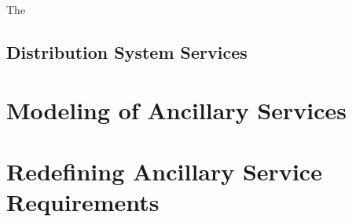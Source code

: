 The 
\subsection{Distribution System Services} %
\label{sub:dsoservices}

\section{Modeling of Ancillary Services} %
\label{sec:Modeling of Ancillary Services}


\section{Redefining Ancillary Service Requirements} %
\label{sec:Redefining Ancillary Service Requirements}


